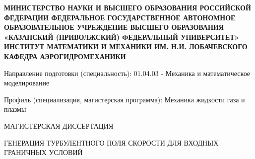 \thispagestyle{empty}%
\begin{center}%
\MakeUppercase{
\textbf{МИНИСТЕРСТВО НАУКИ И ВЫСШЕГО ОБРАЗОВАНИЯ РОССИЙСКОЙ ФЕДЕРАЦИИ
Федеральное государственное автономное образовательное учреждение высшего образования «КАЗАНСКИЙ (ПРИВОЛЖСКИЙ) ФЕДЕРАЛЬНЫЙ УНИВЕРСИТЕТ»
Институт математики и механики им. Н.И. Лобачевского
Кафедра аэрогидромеханики
}}
\end{center}%
%
\vspace{0pt plus4fill} %

Направление подготовки (специальность): 01.04.03 - Механика и математическое моделирование

Профиль (специализация, магистерская программа): Механика жидкости газа и плазмы

\vspace{0pt plus4fill}
\begin{center}%
    \MakeUppercase{Магистерская диссертация}
\end{center}%

\vspace{0pt plus4fill}
\begin{center}%
    \MakeUppercase{Генерация турбулентного поля скорости для входных граничных условий}
\end{center}%

